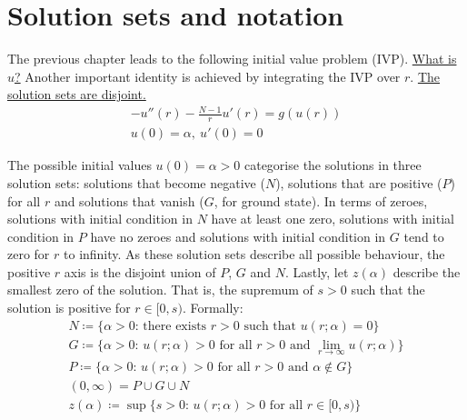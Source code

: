 \section{Solution sets and notation}\label{not}
The previous chapter leads to the following initial value problem (IVP). \underline{What is $u$?} Another important identity is achieved by integrating the IVP over $r$. \underline{The solution sets are disjoint.}
\begin{gather*}-u''(r)-\frac{N-1}{r}u'(r)=g(u(r))\tag{IVP}\label{ivp}\\ u(0)=\alpha,~u'(0)=0\end{gather*}
\begin{equation}\label{ivpint}
\end{equation}

The possible initial values $u(0)=\alpha>0$ categorise the solutions in three solution sets: solutions that become negative ($N$), solutions that are positive ($P$) for all $r$ and solutions that vanish ($G$, for ground state). In terms of zeroes, solutions with initial condition in $N$ have at least one zero, solutions with initial condition in $P$ have no zeroes and solutions with initial condition in $G$ tend to zero for $r$ to infinity. As these solution sets describe all possible behaviour, the positive $r$ axis is the disjoint union of $P$, $G$ and $N$. Lastly, let $z(\alpha)$ describe the smallest zero of the solution. That is, the supremum of $s>0$ such that the solution is positive for $r\in[0,s)$. Formally:
\setlength{\jot}{1em}
\\\begin{gather*}
  N \coloneqq \text{\{$\alpha>0$: there exists $r>0$ such that $u(r;\alpha)=0$\}} \\
  G \coloneqq \text{\{$\alpha>0$: $u(r;\alpha)>0$ for all $r>0$ and $\underset{r\to\infty}{\lim}u(r;\alpha)$\}} \\
  P \coloneqq \text{\{$\alpha>0$: $u(r;\alpha)>0$ for all $r>0$ and $\alpha\notin G$\}}\\
  (0,\infty) = P\cup G\cup N\\
  z(\alpha) \coloneqq \text{$\sup\{s>0$: $u(r;\alpha)>0$ for all $r\in[0,s)$\}}
\end{gather*}
